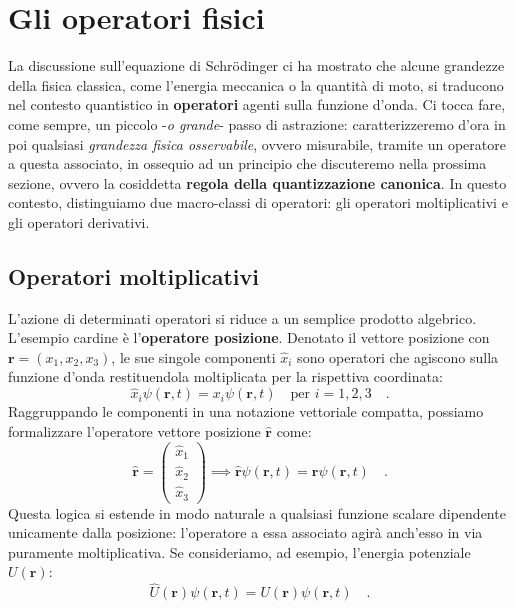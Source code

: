 \section{Gli operatori fisici}
La discussione sull'equazione di Schrödinger ci ha mostrato che alcune grandezze della fisica classica, come l'energia meccanica o la quantità di moto, si traducono nel contesto quantistico in \textbf{operatori} agenti sulla funzione d'onda. Ci tocca fare, come sempre, un piccolo -\emph{o grande}- passo di astrazione: caratterizzeremo d'ora in poi qualsiasi \emph{grandezza fisica osservabile}, ovvero misurabile, tramite un operatore a questa associato, in ossequio ad un principio che discuteremo nella prossima sezione, ovvero la cosiddetta \textbf{regola della quantizzazione canonica}. In questo contesto, distinguiamo due macro-classi di operatori: gli operatori moltiplicativi e gli operatori derivativi.

\subsection{Operatori moltiplicativi}
L'azione di determinati operatori si riduce a un semplice prodotto algebrico. L'esempio cardine è l'\textbf{operatore posizione}. Denotato il vettore posizione con $\bm{r} = (x_1, x_2, x_3)$, le sue singole componenti $\hat{x}_i$ sono operatori che agiscono sulla funzione d'onda restituendola moltiplicata per la rispettiva coordinata:
\begin{equation}
    \hat{x}_i \psi(\bm{r}, t) = x_i \psi(\bm{r}, t) \quad \text{per } i = 1, 2, 3 \quad.
\end{equation}
Raggruppando le componenti in una notazione vettoriale compatta, possiamo formalizzare l'operatore vettore posizione $\hat{\bm{r}}$ come:
\begin{equation}
    \hat{\bm{r}} = 
    \begin{pmatrix}
        \hat{x}_1 \\
        \hat{x}_2 \\
        \hat{x}_3
    \end{pmatrix}
    \implies \hat{\bm{r}}\psi(\bm{r},t) = \bm{r}\psi(\bm{r},t) \quad.
\end{equation}
Questa logica si estende in modo naturale a qualsiasi funzione scalare dipendente unicamente dalla posizione: l'operatore a essa associato agirà anch'esso in via puramente moltiplicativa. Se consideriamo, ad esempio, l'energia potenziale $U(\bm{r})$:
\begin{equation*}
    \hat{U}(\bm{r}) \psi(\bm{r},t) = U(\bm{r})\psi(\bm{r},t) \quad.
\end{equation*}

